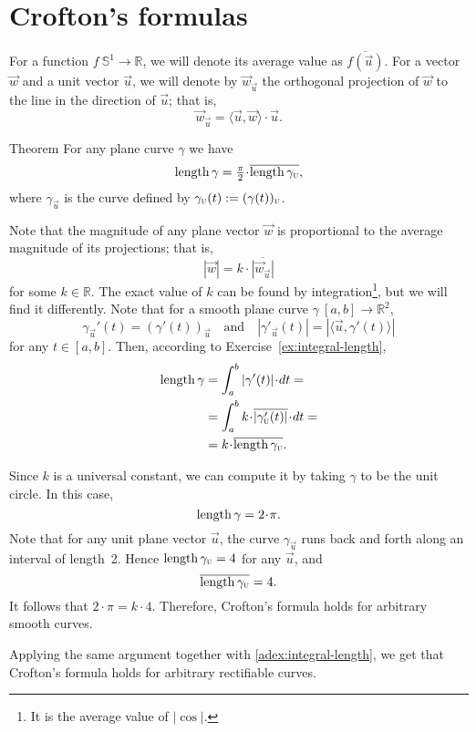 \section{Crofton's formulas}
\label{sec:crofton}

For a function $f\: \mathbb{S}^1 \to \mathbb{R}$, we will denote its average value as $\overline{f(\vec u)}$.
For a vector $\vec w$ and a unit vector $\vec u$, we will denote by $\vec w_{\vec u}$ the orthogonal projection of $\vec w$ to the line in the direction of  $\vec u$;
that is,
\[\vec w_{\vec u}=\langle\vec u,\vec w\rangle\cdot\vec u.\] 

\begin{thm}{Theorem}
For any plane curve $\gamma$ we have
\[
\length\gamma
=\tfrac\pi2\cdot \overline{\length\gamma_{\vec u}},
\]
where $\gamma_{\vec u}$ is the curve defined by $\gamma_{\text{\sc{u}}}(t) \mathrel{:=} (\gamma (t))_{\text{\sc{u}}}$.
\end{thm}

Note that the magnitude of any plane vector ${\vec w}$ is proportional to the average magnitude of its projections; that is,
\[|{\vec w}|=k\cdot \overline{|{\vec w}_{\vec u}|}\]
for some $k \in \mathbb{R}$.
The exact value of $k$ can be found by integration\footnote{It is the average value of $|\cos|$.}, but we will find it differently. 
Note that for a smooth plane curve $\gamma\:[a,b]\to\mathbb{R}^2$,
\[\gamma_{\vec u}'(t)=(\gamma'(t))_{\vec u}
\quad\text{and}\quad
|\gamma'_{\vec u}(t)|=|\langle\vec u,\gamma'(t)\rangle|\]
for any $t \in [a,b]$. Then, according to Exercise~\ref{ex:integral-length},
\begin{align*}
\length\gamma
&=\int_a^b|\gamma'(t)|\cdot dt=
\\
&=\int_a^b  k\cdot \overline{|\gamma_{\vec u}'(t)|}\cdot dt=
\\
&=k\cdot \overline{\length\gamma_{\vec u}}.
\end{align*}

Since $k$ is a universal constant, we can compute it by taking $\gamma$ to be the unit circle.
In this case,
\[\length \gamma=2\cdot\pi.\]
Note that for any unit plane vector ${\vec u}$, the curve $\gamma_{\vec u}$ runs back and forth along an interval of length~2.
Hence $\mathop{\rm length}\nolimits\gamma_{\text{\sc{u}}}=4$ for any $\vec u$, and 
\[\overline{\mathop{\rm length}\nolimits\gamma_{\text{\sc{u}}}} =4.\]
It follows that $2\cdot \pi =k\cdot 4$.
Therefore, Crofton's formula holds for arbitrary smooth curves.

Applying the same argument together with \ref{adex:integral-length}, we get that Crofton's formula holds for arbitrary rectifiable curves.

